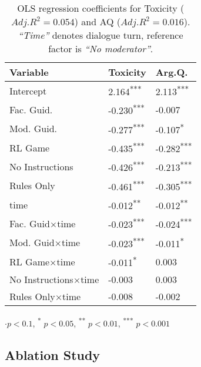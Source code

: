 \begin{table}[t]
\centering
    \begin{tabular}{lll}
        \toprule
        \textbf{Variable} & \textbf{Toxicity} & \textbf{Arg.Q.} \\
        \midrule
        Intercept & 2.164\textsuperscript{***} & 2.113\textsuperscript{***} \\
        Fac. Guid. & -0.230\textsuperscript{***} & -0.007 \\
        Mod. Guid. & -0.277\textsuperscript{***} & -0.107\textsuperscript{*} \\
        \ac{RL} Game & -0.435\textsuperscript{***} & -0.282\textsuperscript{***} \\
        No Instructions & -0.426\textsuperscript{***} & -0.213\textsuperscript{***} \\
        Rules Only & -0.461\textsuperscript{***} & -0.305\textsuperscript{***} \\
        time & -0.012\textsuperscript{**} & -0.012\textsuperscript{**} \\
        Fac. Guid$\times$time & -0.023\textsuperscript{***} & -0.024\textsuperscript{***} \\
        Mod. Guid$\times$time & -0.023\textsuperscript{***} & -0.011\textsuperscript{*} \\
        \ac{RL} Game$\times$time & -0.011\textsuperscript{*} & 0.003 \\
        No Instructions$\times$time & -0.003 & 0.003 \\
        Rules Only$\times$time & -0.008 & -0.002 \\
        \bottomrule
    \end{tabular}
    \small
    $\cdot p<0.1$, \textsuperscript{*} $p<0.05$, \textsuperscript{**} $p<0.01$, \textsuperscript{***} $p<0.001$
    \normalsize
    \caption{\ac{OLS} regression coefficients for Toxicity ($Adj. R^2=0.054$) and \ac{AQ} ($Adj. R^2=0.016$). \textit{“Time”} denotes dialogue turn, reference factor is \textit{“No moderator”}.}
    \label{tab:timeseries}
\end{table}



\subsection{Ablation Study}
\label{ssec:results:ablation}

